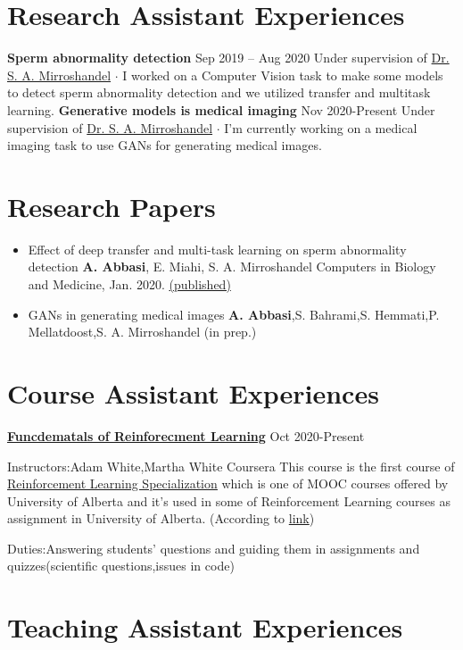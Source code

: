 \documentclass[paper=a4,fontsize=11pt]{scrartcl} %
\newcommand{\dline}{\newline \newline}
\newcommand{\NewPart}[1]{\section*{{#1}}}
\begin{document}
\NewPart{Research Assistant Experiences}
\textbf{Sperm abnormality detection} \hfill \footnotesize Sep 2019 – Aug 2020 \newline
Under supervision of \href{https://staff.guilan.ac.ir/mirroshandel/?lg=1}{Dr. S. A. Mirroshandel} \newline
$\cdot$ \footnotesize  I worked on a Computer Vision task to make some models to detect sperm abnormality detection and we utilized transfer and multitask learning. \newline
\newline
\textbf{Generative models is medical imaging} \hfill \footnotesize Nov 2020-Present \newline
Under supervision of \href{https://staff.guilan.ac.ir/mirroshandel/?lg=1}{Dr. S. A. Mirroshandel} \newline
$\cdot$ \footnotesize  I'm currently working on a medical imaging task to use GANs for generating medical images.

\NewPart{Research Papers}
\begin{itemize}

\item Effect of deep transfer and multi-task learning on sperm abnormality detection \newline
\textbf{A. Abbasi}, E. Miahi, S. A. Mirroshandel \newline
Computers in Biology and Medicine, Jan. 2020. \href{https://www.sciencedirect.com/science/article/pii/S0010482520304522}{(published)}

\item GANs in generating medical images \newline
\textbf{A. Abbasi},S. Bahrami,S. Hemmati,P. Mellatdoost,S. A. Mirroshandel (in prep.)
\end{itemize}


\NewPart{Course Assistant Experiences} 

\textbf{ \href{https://www.coursera.org/learn/fundamentals-of-reinforcement-learning}{Funcdematals of Reinforecment Learning}} \footnotesize \hfill Oct 2020-Present
\begin{itemize}
\footnotesize Instructors:Adam White,Martha White \hfill Coursera \newline 
\newline
\footnotesize{This course is the first course of \href{https://www.coursera.org/specializations/reinforcement-learning}{\underline{Reinforcement Learning Specialization}} which is one of MOOC courses offered by University of Alberta and it's used in some of Reinforcement Learning courses as assignment in University of Alberta.} (According to \href{https://marthawhite.github.io/rlgrad/}{link}) \dline

\footnotesize Duties:Answering students' questions and guiding them in assignments and quizzes(scientific questions,issues in code) \newline
\end{itemize}
\NewPart{Teaching Assistant Experiences}
\end{document}
